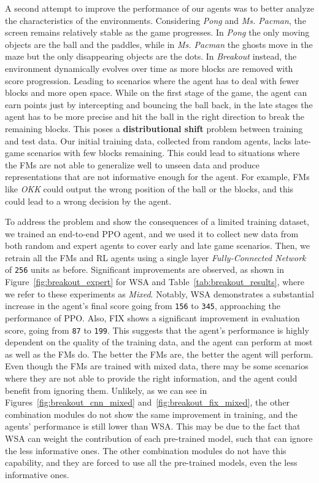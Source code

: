 A second attempt to improve the performance of our agents was to better analyze the characteristics of the environments.
Considering \textit{Pong} and \textit{Ms. Pacman}, the screen remains relatively stable as the game progresses.
In \textit{Pong} the only moving objects are the ball and the paddles, while in \textit{Ms. Pacman} the ghosts move in the maze but the only disappearing objects are the dots.
In \textit{Breakout} instead, the environment dynamically evolves over time as more blocks are removed with score progression.
Leading to scenarios where the agent has to deal with fewer blocks and more open space.
While on the first stage of the game, the agent can earn points just by intercepting and bouncing the ball back, in the late stages the agent has to be more precise and hit the ball in the right direction to break the remaining blocks.
This poses a \textbf{distributional shift} problem between training and test data.
Our initial training data, collected from random agents, lacks late-game scenarios with few blocks remaining.
This could lead to situations where the FMs are not able to generalize well to unseen data and produce representations that are not informative enough for the agent.
For example, FMs like \textit{OKK} could output the wrong position of the ball or the blocks, and this could lead to a wrong decision by the agent.


To address the problem and show the consequences of a limited training dataset, we trained an end-to-end PPO agent, and we used it to collect new data from both random and expert agents to cover early and late game scenarios.
Then, we retrain all the FMs and RL agents using a single layer \textit{Fully-Connected Network} of \texttt{256} units as before.
Significant improvements are observed, as shown in Figure~\ref{fig:breakout_expert} for WSA and Table~\ref{tab:breakout_results}, where we refer to these experiments as \textit{Mixed}.
Notably, WSA demonstrates a substantial increase in the agent's final score going from \texttt{156} to \texttt{345}, approaching the performance of PPO\@.
Also, FIX shows a significant improvement in evaluation score, going from \texttt{87} to \texttt{199}.
This suggests that the agent's performance is highly dependent on the quality of the training data, and the agent can perform at most as well as the FMs do.
The better the FMs are, the better the agent will perform.
Even though the FMs are trained with mixed data, there may be some scenarios where they are not able to provide the right information, and the agent could benefit from ignoring them.
Unlikely, as we can see in Figures~\ref{fig:breakout_cnn_mixed} and~\ref{fig:breakout_fix_mixed}, the other combination modules do not show the same improvement in training, and the agents' performance is still lower than WSA\@.
This may be due to the fact that WSA can weight the contribution of each pre-trained model, such that can ignore the less informative ones.
The other combination modules do not have this capability, and they are forced to use all the pre-trained models, even the less informative ones.


